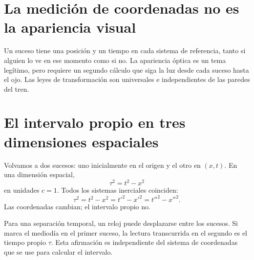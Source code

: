 \section{La medición de coordenadas no es la apariencia visual}

\begin{classroomqa}
\end{classroomqa}

Un suceso tiene una posición y un tiempo en cada sistema de referencia, tanto si alguien lo ve en ese momento como si no. La apariencia óptica es un tema legítimo, pero requiere un segundo cálculo que siga la luz desde cada suceso hasta el ojo. Las leyes de transformación son universales e independientes de las paredes del tren.

\section{El intervalo propio en tres dimensiones espaciales}

Volvamos a dos sucesos: uno inicialmente en el origen y el otro en \((x,t)\). En una dimensión espacial,
\begin{equation}
\tau^2=t^2-x^2
\label{eq:sr2-interval-1d}
\end{equation}
en unidades \(c=1\). Todos los sistemas inerciales coinciden:
\begin{equation}
\tau^2
=t^2-x^2
=t'^2-x'^2
=t''^2-x''^2.
\end{equation}
Las coordenadas cambian; el intervalo propio no.

Para una separación temporal, un reloj puede desplazarse entre los sucesos. Si marca el mediodía en el primer suceso, la lectura transcurrida en el segundo es el tiempo propio \(\tau\). Esta afirmación es independiente del sistema de coordenadas que se use para calcular el intervalo.

